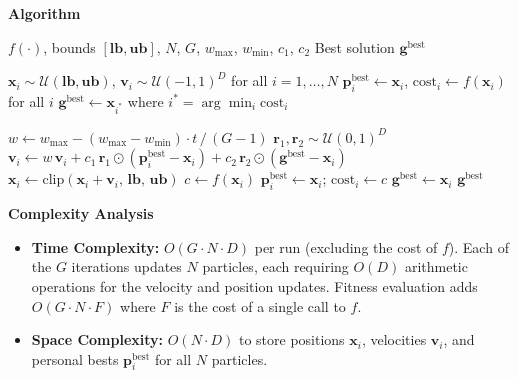 \textbf{Algorithm}

\begin{algorithm}[H]
\caption{Particle Swarm Optimization}
\label{alg:pso}
\begin{algorithmic}[1]
\REQUIRE $f(\cdot)$, bounds $[\mathbf{lb},\mathbf{ub}]$, $N$, $G$,
         $w_{\max}$, $w_{\min}$, $c_1$, $c_2$
\ENSURE Best solution $\mathbf{g}^{\text{best}}$

\STATE $\mathbf{x}_i \sim \mathcal{U}(\mathbf{lb},\mathbf{ub})$,\;
       $\mathbf{v}_i \sim \mathcal{U}(-1,1)^D$ \quad for all $i = 1,\ldots,N$
\STATE $\mathbf{p}_i^{\text{best}} \leftarrow \mathbf{x}_i$,\;
       $\text{cost}_i \leftarrow f(\mathbf{x}_i)$ \quad for all $i$
\STATE $\mathbf{g}^{\text{best}} \leftarrow \mathbf{x}_{i^*}$ where
       $i^* = \arg\min_i \text{cost}_i$

  \STATE $w \leftarrow w_{\max} - (w_{\max}-w_{\min})\cdot t\,/\,(G-1)$
    \STATE $\mathbf{r}_1, \mathbf{r}_2 \sim \mathcal{U}(0,1)^D$
    \STATE $\mathbf{v}_i \leftarrow w\,\mathbf{v}_i
           + c_1\,\mathbf{r}_1 \odot (\mathbf{p}_i^{\text{best}}-\mathbf{x}_i)
           + c_2\,\mathbf{r}_2 \odot (\mathbf{g}^{\text{best}}-\mathbf{x}_i)$
    \STATE $\mathbf{x}_i \leftarrow \mathrm{clip}(\mathbf{x}_i + \mathbf{v}_i,\,
           \mathbf{lb},\,\mathbf{ub})$
    \STATE $c \leftarrow f(\mathbf{x}_i)$
      \STATE $\mathbf{p}_i^{\text{best}} \leftarrow \mathbf{x}_i$;\;
             $\text{cost}_i \leftarrow c$
        \STATE $\mathbf{g}^{\text{best}} \leftarrow \mathbf{x}_i$
      \ENDIF
    \ENDIF
  \ENDFOR
\ENDFOR
\RETURN $\mathbf{g}^{\text{best}}$
\end{algorithmic}
\end{algorithm}

\textbf{Complexity Analysis}

\begin{itemize}
  \item \textbf{Time Complexity:} $O(G \cdot N \cdot D)$ per run (excluding the cost of $f$).
        Each of the $G$ iterations updates $N$ particles, each requiring $O(D)$ arithmetic
        operations for the velocity and position updates. Fitness evaluation adds $O(G\cdot N
        \cdot F)$ where $F$ is the cost of a single call to $f$.
  \item \textbf{Space Complexity:} $O(N \cdot D)$ to store positions $\mathbf{x}_i$,
        velocities $\mathbf{v}_i$, and personal bests $\mathbf{p}_i^{\text{best}}$ for all
        $N$ particles.
\end{itemize}

